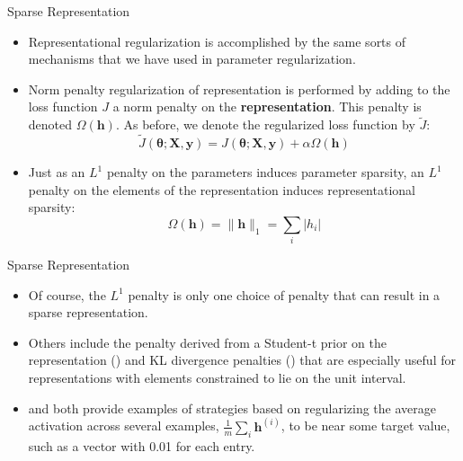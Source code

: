 \documentclass[10pt]{beamer}
\begin{document}
	\begin{frame}{Sparse Representation}
		\begin{itemize}
			\item Representational regularization is accomplished by the same sorts of mechanisms that we have used in parameter regularization.
			\pause			
			\item Norm penalty regularization of representation is performed by adding to the loss function $J$ a norm penalty on the \textbf{representation}. This penalty is denoted $\Omega(\bm{h})$. As before, we denote the regularized loss function by $\tilde{J}$:
			$$\tilde{J}(\bm{\theta};\bm{X},\bm{y})=J(\bm{\theta};\bm{X},\bm{y})+\alpha\Omega(\bm{h})$$
			
			\pause
			\item Just as an $L^1$ penalty on the parameters induces parameter sparsity, an $L^1$ penalty on the elements of the representation induces representational sparsity:
			$$\Omega(\bm{h})=\lVert\bm{h}\rVert_1=\sum_i\left|h_i\right|$$
		\end{itemize}
	\end{frame}
	
	\begin{frame}{Sparse Representation}
		\begin{itemize}
			\item Of course, the $L^1$ penalty is only one choice of penalty that can result in a sparse representation.
			\pause
			\item Others include the penalty derived from a Student-t prior on the representation (\citet{olshausen2005close,bergstra2011algorithms}) and KL divergence penalties (\citet{larochelle2008classification}) that are especially useful for representations with elements constrained to lie on the unit interval.
			\pause
			\item \citet{lee2008sparse} and \citet{goodfellow2009measuring} both provide examples of strategies based on regularizing the average activation across several examples, $\frac{1}{m}\sum_i\bm{h}^{(i)}$, to be near some target value, such as a vector with 0.01 for each entry.
		\end{itemize}
	\end{frame}
	
\end{document}
